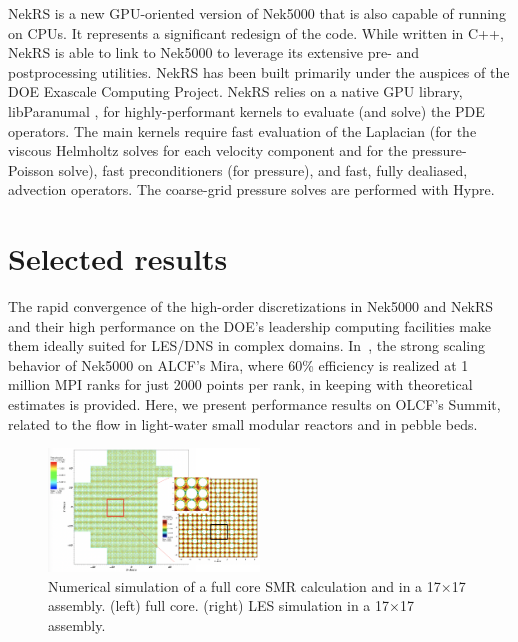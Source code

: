 \documentclass{anstrans}
\begin{document}
\medskip
NekRS is a new GPU-oriented version of Nek5000  that is also capable of running
on CPUs. It represents a significant redesign of the code. While written in
C++, NekRS is able to link to Nek5000 to leverage its extensive pre- and
postprocessing utilities. NekRS has been built primarily under the auspices of
the DOE Exascale Computing Project.  NekRS relies on a native GPU library,
libParanumal \cite{libP}, for highly-performant kernels to evaluate (and
solve) the PDE operators.  The main kernels require fast evaluation of the 
Laplacian (for the viscous Helmholtz solves for each velocity component and
for the pressure-Poisson solve), fast preconditioners (for pressure), and
fast, fully dealiased, advection operators.  The coarse-grid pressure solves
are performed with Hypre.


\section{Selected results}

The rapid convergence of the high-order discretizations in Nek5000 and NekRS
and their high performance on the DOE's leadership computing facilities make
them ideally suited for LES/DNS in complex domains.  
In~\cite{fischer15}, the strong scaling behavior of Nek5000 on ALCF's Mira, 
where 60\% efficiency is realized at 1 million MPI ranks for just 2000 points 
per rank, in keeping with theoretical estimates is provided.  
Here, we present performance results on OLCF's Summit,
related to the flow in light-water small modular reactors and in pebble beds.

\begin{figure}[!ht]
\centering
\includegraphics[width=0.5\textwidth]{./Figures/full_core_summary.png}
\caption{Numerical simulation of a full core SMR calculation and in a 17$\times$17 assembly.
  (left) full core. (right) LES simulation in a 17$\times$17 assembly.}
\label{fig:gpu2}
\end{figure}
\end{document}
